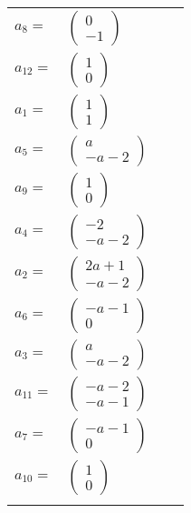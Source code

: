 \documentclass[1p]{elsarticle_modified}
\theoremstyle{definition}
\begin{document}
\begin{tabular}{m{7pt} m{180pt} m{7pt} m{180pt} }
\flushright $a_{8}=$&$\begin{pmatrix}0\\-1\end{pmatrix}$ \\
\flushright $a_{12}=$&$\begin{pmatrix}1\\0\end{pmatrix}$ \\
\flushright $a_{1}=$&$\begin{pmatrix}1\\1\end{pmatrix}$ \\
\flushright $a_{5}=$&$\begin{pmatrix}a\\- a-2\end{pmatrix}$ \\
\flushright $a_{9}=$&$\begin{pmatrix}1\\0\end{pmatrix}$ \\
\flushright $a_{4}=$&$\begin{pmatrix}-2\\- a-2\end{pmatrix}$ \\
\flushright $a_{2}=$&$\begin{pmatrix}2 a+1\\- a-2\end{pmatrix}$ \\
\flushright $a_{6}=$&$\begin{pmatrix}- a-1\\0\end{pmatrix}$ \\
\flushright $a_{3}=$&$\begin{pmatrix}a\\- a-2\end{pmatrix}$ \\
\flushright $a_{11}=$&$\begin{pmatrix}- a-2\\- a-1\end{pmatrix}$ \\
\flushright $a_{7}=$&$\begin{pmatrix}- a-1\\0\end{pmatrix}$ \\
\flushright $a_{10}=$&$\begin{pmatrix}1\\0\end{pmatrix}$\\&\end{tabular}
\end{document}
